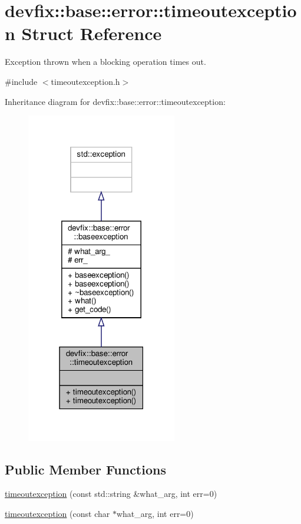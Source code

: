 \hypertarget{structdevfix_1_1base_1_1error_1_1timeoutexception}{}\section{devfix\+:\+:base\+:\+:error\+:\+:timeoutexception Struct Reference}
\label{structdevfix_1_1base_1_1error_1_1timeoutexception}


Exception thrown when a blocking operation times out.  




{\ttfamily \#include $<$timeoutexception.\+h$>$}



Inheritance diagram for devfix\+:\+:base\+:\+:error\+:\+:timeoutexception\+:
\nopagebreak
\begin{figure}[H]
\begin{center}
\leavevmode
\includegraphics[width=186pt]{structdevfix_1_1base_1_1error_1_1timeoutexception__inherit__graph}
\end{center}
\end{figure}
\subsection*{Public Member Functions}
\begin{DoxyCompactItemize}
\item 
\hyperlink{structdevfix_1_1base_1_1error_1_1timeoutexception_a1795157a577b45e026b11c3b3cec80b3}{timeoutexception} (const std\+::string \&what\+\_\+arg, int err=0)
\item 
\hyperlink{structdevfix_1_1base_1_1error_1_1timeoutexception_ac35d347533a4a8ba1d19900846784e72}{timeoutexception} (const char $\ast$what\+\_\+arg, int err=0)
\end{DoxyCompactItemize}
